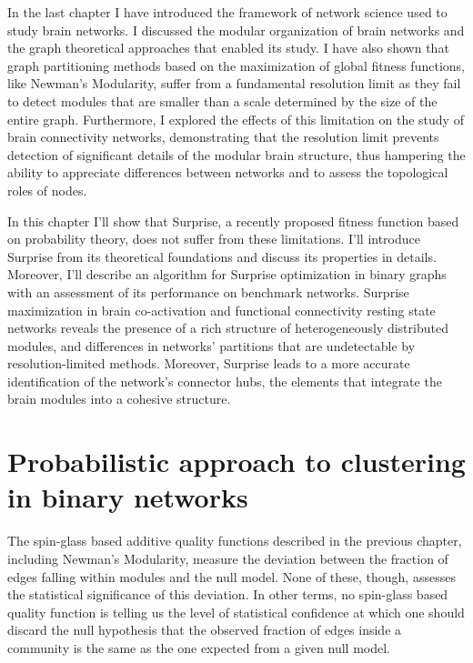 In the last chapter I have introduced the framework of network science used to study brain networks.
I discussed the modular organization of brain networks and the graph theoretical approaches that enabled its study.
I have also shown that graph partitioning methods based on the maximization of global fitness functions, like Newman's Modularity, suffer from a fundamental resolution limit as they fail to detect modules that are smaller than a scale determined by the size of the entire graph.
Furthermore, I explored the effects of this limitation on the study of brain connectivity networks, demonstrating that the resolution limit prevents detection of significant details of the modular brain structure, thus hampering the ability to appreciate differences between networks and to assess the topological roles of nodes.

In this chapter I'll show that Surprise, a recently proposed fitness function based on probability theory, does not suffer from these limitations.
I'll introduce Surprise from its theoretical foundations and discuss its properties in details.
Moreover, I'll describe an algorithm for Surprise optimization in binary graphs with an assessment of its performance on benchmark networks.
Surprise maximization in brain co-activation and functional connectivity resting state networks reveals the presence of a rich structure of heterogeneously distributed modules, and differences in networks' partitions that are undetectable by resolution-limited methods.
Moreover, Surprise leads to a more accurate identification of the network's connector hubs, the elements that integrate the brain modules into a cohesive structure.

\section{Probabilistic approach to clustering in binary networks}\label{sec:probability_clustering}
The spin-glass based additive quality functions described in the previous chapter, including Newman's Modularity, measure the deviation between the fraction of edges falling within modules and the null model. None of these, though, assesses the statistical significance of this deviation.
In other terms, no spin-glass based quality function is telling us the level of statistical confidence at which one should discard the null hypothesis that the observed fraction of edges inside a community is the same as the one expected from a given null model.

